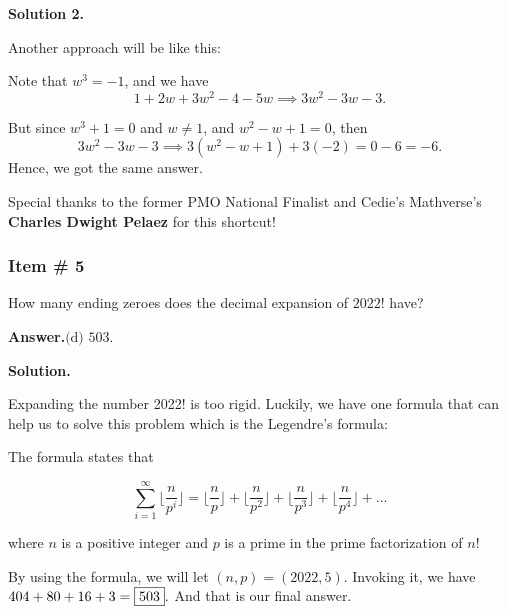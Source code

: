 \documentclass[11pt,paper=letter]{scrartcl}
\newcommand{\ans}[1]{{\sffamily \bfseries Answer.}\;\(\boxed{\text{#1}}\).}
\newcommand{\sol}{{\sffamily \bfseries Solution.}\;}
\newcommand{\soln}[1]{{\sffamily \bfseries Solution #1.}\;}
\newenvironment{rem}%
{\noindent \ignorespaces \small \sffamily  \sansmath {\bfseries \color{DarkMidnightBlue} Remark.}}%
{\ignorespacesafterend}
\begin{document}
\soln2

Another approach will be like this:

Note that $w^3 = -1$, and we have $$1 + 2w + 3w^2 -4 - 5w \implies 3w^2 -3w -3.$$

But since $w^3 + 1 = 0$ and $w \neq 1$, and $w^2 - w + 1 =0$, then $$3w^2 -3w -3 \implies 3(w^2 - w + 1) + 3(-2) = 0 - 6 = -6. $$ Hence, we got the same answer.

\begin{mdframed}
\begin{rem}
Special thanks to the former PMO National Finalist and Cedie's Mathverse's \textbf{Charles Dwight Pelaez} for this shortcut!
\end{rem}
\end{mdframed}
\subsubsection{Item \# 5}

\begin{probboxed}
How many ending zeroes does the decimal expansion of $2022!$ have?
    
\end{probboxed}
  
 \ans{(d) 503}
 
 \sol
 
Expanding the number 2022! is too rigid. Luckily, we have one formula that can help us to solve this problem which is the Legendre's formula:

\begin{mdframed}
\begin{theorem}

The formula states that

\begin{equation*}
    \sum_{i=1} ^{\infty} \bigg \lfloor \dfrac{n}{p^i} \bigg \rfloor = \bigg \lfloor \dfrac{n}{p} \bigg \rfloor + \bigg \lfloor \dfrac{n}{p^2} \bigg \rfloor + \bigg \lfloor \dfrac{n}{p^3} \bigg \rfloor + \bigg \lfloor \dfrac{n}{p^4} \bigg \rfloor + ...
\end{equation*}

where $n$ is a positive integer and $p$ is a prime in the prime factorization of $n!$

\end{theorem}
\end{mdframed}

By using the formula, we will let $(n,p) = (2022, 5)$. Invoking it, we have $404 + 80 + 16 + 3 = \fbox{503}.$ And that is our final answer.
\end{document}
